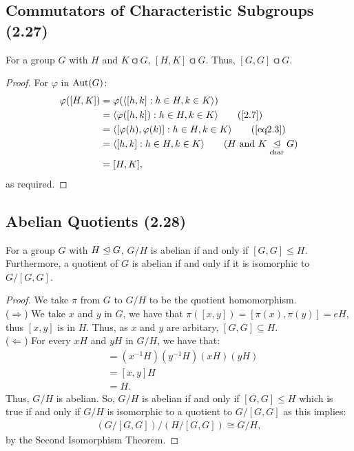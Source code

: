 \subsection{Commutators of Characteristic Subgroups (2.27)} \label{2.27}

For a group $G$ with $H$ and $K \csub G$, $[H, K] \csub G$. Thus, $[G, G] \csub G$.

\begin{proof}
    For $\varphi$ in $\operatorname{Aut}(G)$: \begin{align*}
        \varphi([H, K]) 
        &= \varphi(\ang{[h, k] : h \in H, k \in K}) \\
        &= \ang{\varphi([h, k]) : h \in H, k \in K} \tag{\ref{2.7}} \\
        &= \ang{[\varphi(h), \varphi(k)] : h \in H, k \in K} \tag{\ref{eq2.3}} \\
        &= \ang{[h, k] : h \in H, k \in K} \tag{$H$ and $K \csub G$} \\
        &= [H, K],
    \end{align*} as required.
\end{proof}

\subsection{Abelian Quotients (2.28)} \label{2.28}

For a group $G$ with $H \trianglelefteq G$, $G / H$ is abelian if and only if 
$[G, G] \leq H$. Furthermore, a quotient of $G$
is abelian if and only if it is isomorphic to $G / [G, G]$.

\begin{proof}
    We take $\pi$ from $G$ to $G / H$ to be the quotient homomorphism.
    \\[\baselineskip]
    ($\Longrightarrow$) 
    We take $x$ and $y$ in $G$, we have that $\pi([x, y]) = [\pi(x), \pi(y)] = eH$,
    thus $[x, y]$ is in $H$. Thus, as $x$ and $y$ are arbitary, $[G, G] \subseteq H$.
    \\[\baselineskip]
    ($\Longleftarrow$)
    For every $xH$ and $yH$ in $G / H$, we have that: \begin{align*}
        [xH, yH] 
        &= (x^{-1}H)(y^{-1}H)(xH)(yH) \\
        &= [x, y]H \\
        &= H.
    \end{align*} Thus, $G / H$ is abelian. So, $G / H$ is abelian if
    and only if $[G, G] \leq H$ which is true if and only if $G / H$ is isomorphic
    to a quotient to $G / [G, G]$ as this implies: \begin{align*}
        (G / [G, G]) / (H / [G, G]) \cong G / H,
    \end{align*} by the Second Isomorphism Theorem.
\end{proof}

